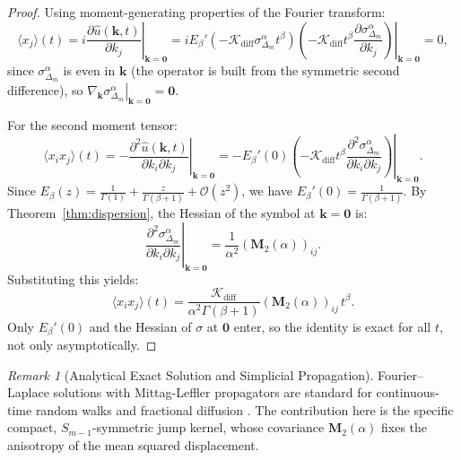 \documentclass[11pt,a4paper]{article}
\theoremstyle{plain}
\theoremstyle{definition}
\theoremstyle{remark}
\newtheorem{remark}[theorem]{Remark}
\numberwithin{equation}{section}
\begin{document}
\begin{proof}
Using moment-generating properties of the Fourier transform:
\begin{equation}
\langle x_j \rangle(t) = \left. i \frac{\partial \widehat{u}(\mathbf{k}, t)}{\partial k_j} \right|_{\mathbf{k}=\mathbf{0}} = \left. i E_\beta'\left(-\mathcal{K}_{\text{diff}}\sigma_{\Delta_m}^\alpha t^\beta\right) \left(-\mathcal{K}_{\text{diff}} t^\beta \frac{\partial \sigma_{\Delta_m}^\alpha}{\partial k_j}\right) \right|_{\mathbf{k}=\mathbf{0}} = 0,
\end{equation}
since $\sigma_{\Delta_m}^\alpha$ is even in $\mathbf{k}$ (the operator is built from the symmetric second difference), so $\left.\nabla_\mathbf{k}\sigma_{\Delta_m}^\alpha\right|_{\mathbf{k}=\mathbf{0}} = \mathbf{0}$.

For the second moment tensor:
\begin{equation}
\langle x_i x_j \rangle(t) = \left. -\frac{\partial^2 \widehat{u}(\mathbf{k}, t)}{\partial k_i \partial k_j} \right|_{\mathbf{k}=\mathbf{0}} = \left. -E_\beta'(0) \left(-\mathcal{K}_{\text{diff}} t^\beta \frac{\partial^2 \sigma_{\Delta_m}^\alpha}{\partial k_i \partial k_j}\right) \right|_{\mathbf{k}=\mathbf{0}}.
\end{equation}
Since $E_\beta(z) = \frac{1}{\Gamma(1)} + \frac{z}{\Gamma(\beta+1)} + \mathcal{O}(z^2)$, we have $E_\beta'(0) = \frac{1}{\Gamma(\beta+1)}$. By Theorem~\ref{thm:dispersion}, the Hessian of the symbol at $\mathbf{k}=\mathbf{0}$ is:
\begin{equation}
\left. \frac{\partial^2 \sigma_{\Delta_m}^\alpha}{\partial k_i \partial k_j} \right|_{\mathbf{k}=\mathbf{0}} = \frac{1}{\alpha^2}(\mathbf{M}_2(\alpha))_{ij}.
\end{equation}
Substituting this yields:
\begin{equation}
\langle x_i x_j \rangle(t) = \frac{\mathcal{K}_{\text{diff}}}{\alpha^2 \Gamma(\beta+1)} (\mathbf{M}_2(\alpha))_{ij}\, t^\beta.
\end{equation}
Only $E_\beta'(0)$ and the Hessian of $\sigma$ at $\mathbf{0}$ enter, so the identity is exact for all $t$, not only asymptotically.
\end{proof}

\begin{remark}[Analytical Exact Solution and Simplicial Propagation]
Fourier--Laplace solutions with Mittag-Leffler propagators are standard for continuous-time random walks and fractional diffusion \cite{metzler2000}. The contribution here is the specific compact, $S_{m-1}$-symmetric jump kernel, whose covariance $\mathbf{M}_2(\alpha)$ fixes the anisotropy of the mean squared displacement.
\end{remark}
\end{document}
